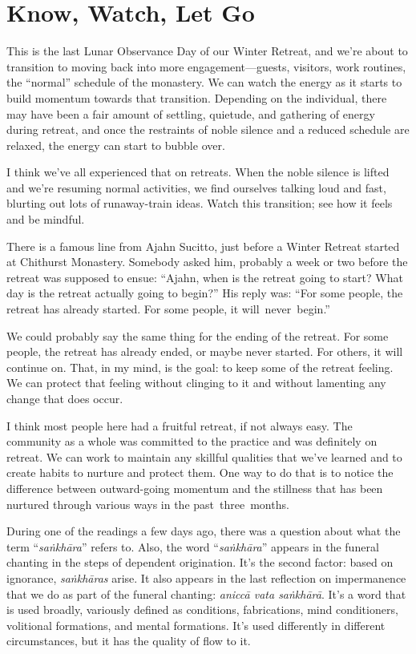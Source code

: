 
\chapter{Know, Watch, Let Go}


This is the last Lunar Observance Day of our Winter Retreat, and we're about to transition to moving back into more engagement---guests, visitors, work routines, the ``normal'' schedule of the monastery. We can watch the energy as it starts to build momentum towards that transition. Depending on the individual, there may have been a fair amount of settling, quietude, and gathering of energy during retreat, and once the restraints of noble silence and a reduced schedule are relaxed, the energy can start to bubble over.

I think we've all experienced that on retreats. When the noble silence is lifted and we're resuming normal activities, we find ourselves talking loud and fast, blurting out lots of runaway-train ideas. Watch this transition; see how it feels and be mindful.

There is a famous line from Ajahn Sucitto, just before a Winter Retreat started at Chithurst Monastery. Somebody asked him, probably a week or two before the retreat was supposed to ensue: ``Ajahn, when is the retreat going to start? What day is the retreat actually going to begin?'' His reply was: ``For some people, the retreat has already started. For some people, it \mbox{will never begin.''}

We could probably say the same thing for the ending of the retreat. For some people, the retreat has already ended, or maybe never started. For others, it will continue on. That, in my mind, is the goal: to keep some of the retreat feeling. We can protect that feeling without clinging to it and without lamenting any change that does occur.

I think most people here had a fruitful retreat, if not always easy. The community as a whole was committed to the practice and was definitely on retreat. We can work to maintain any skillful qualities that we've learned and to create habits to nurture and protect them. One way to do that is to notice the difference between outward-going momentum and the stillness that has been nurtured through various ways in the \mbox{past three months.}

During one of the readings a few days ago, there was a question about what the term ``\emph{saṅkhāra}'' refers to. Also, the word ``\emph{saṅkhāra}'' appears in the funeral chanting in the steps of dependent origination. It's the second factor: based on ignorance, \emph{saṅkhāras} arise. It also appears in the last reflection on impermanence that we do as part of the funeral chanting: \emph{aniccā vata saṅkhārā}. It's a word that is used broadly, variously defined as conditions, fabrications, mind conditioners, volitional formations, and mental formations. It's used differently in different circumstances, but it has the quality of flow to it.

